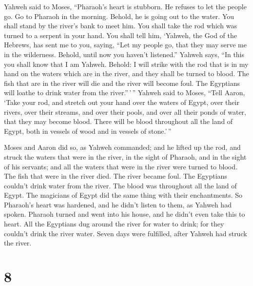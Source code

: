  Yahweh said to Moses, ``Pharaoh's heart is stubborn. He
refuses to let the people go.  Go to Pharaoh in the
morning. Behold, he is going out to the water. You shall stand by the
river's bank to meet him. You shall take the rod which was turned to a
serpent in your hand.  You shall tell him, `Yahweh, the
God of the Hebrews, has sent me to you, saying, ``Let my people go, that
they may serve me in the wilderness. Behold, until now you haven't
listened.''  Yahweh says, ``In this you shall know that I
am Yahweh. Behold: I will strike with the rod that is in my hand on the
waters which are in the river, and they shall be turned to blood.
 The fish that are in the river will die and the river
will become foul. The Egyptians will loathe to drink water from the
river.''\,'\,''  Yahweh said to Moses, ``Tell Aaron,
`Take your rod, and stretch out your hand over the waters of Egypt, over
their rivers, over their streams, and over their pools, and over all
their ponds of water, that they may become blood. There will be blood
throughout all the land of Egypt, both in vessels of wood and in vessels
of stone.'\,''

 Moses and Aaron did so, as Yahweh commanded; and he
lifted up the rod, and struck the waters that were in the river, in the
sight of Pharaoh, and in the sight of his servants; and all the waters
that were in the river were turned to blood.  The fish
that were in the river died. The river became foul. The Egyptians
couldn't drink water from the river. The blood was throughout all the
land of Egypt.  The magicians of Egypt did the same thing
with their enchantments. So Pharaoh's heart was hardened, and he didn't
listen to them, as Yahweh had spoken.  Pharaoh turned and
went into his house, and he didn't even take this to heart.
 All the Egyptians dug around the river for water to
drink; for they couldn't drink the river water.  Seven
days were fulfilled, after Yahweh had struck the river.

\hypertarget{section-7}{%
\section{8}\label{section-7}}

